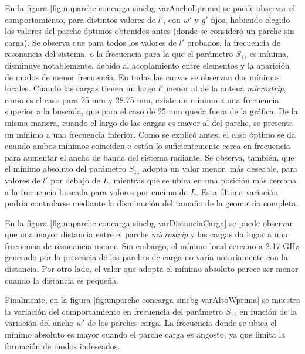 En la figura \ref{fig:unparche-concarga-sinebg-varAnchoLprima} se puede observar el comportamiento, para distintos valores de $l'$, con $w'$ y $g'$ fijos, habiendo elegido los valores del parche óptimos obtenidos antes (donde se consideró un parche sin carga). Se observa que para todos los valores de $l'$ probados, la frecuencia de resonancia del sistema, o la frecuencia para la que el parámetro $S_{11}$ es mínima, disminuye notablemente, debido al acoplamiento entre elementos y la aparición de modos de menor frecuencia. En todas las curvas se observan dos mínimos locales. Cuando las cargas tienen un largo $l'$ menor al de la antena \textit{microstrip}, como es el caso para 25 mm y 28.75 mm, existe un mínimo a una frecuencia superior a la buscada, que para el caso de 25 mm queda fuera de la gráfica. De la misma manera, cuando el largo de las cargas es mayor al del parche, se presenta un mínimo a una frecuencia inferior. Como se explicó antes, el caso óptimo se da cuando ambos mínimos coinciden o están lo suficientemente cerca en frecuencia para aumentar el ancho de banda del sistema radiante. Se observa, también, que el mínimo absoluto del parámetro $S_{11}$ adopta un valor menor, más deseable, para valores de $l'$ por debajo de $L$, mientras que se ubica en una posición más cercana a la frecuencia buscada para valores por encima de $L$. Esta última variación podría controlarse mediante la disminución del tamaño de la geometría completa.

En la figura \ref{fig:unparche-concarga-sinebg-varDistanciaCarga} se puede observar que una mayor distancia entre el parche \textit{microstrip} y las cargas da lugar a una frecuencia de resonancia menor. Sin embargo, el mínimo local cercano a 2.17 GHz generado por la presencia de los parches de carga no varía notoriamente con la distancia. Por otro lado, el valor que adopta el mínimo absoluto parece ser menor cuando la distancia es pequeña.

Finalmente, en la figura \ref{fig:unparche-concarga-sinebg-varAltoWprima} se muestra la variación del comportamiento en frecuencia del parámetro $S_{11}$ en función de la variación del ancho $w'$ de los parches carga. La frecuencia donde se ubica el mínimo absoluto es mayor cuando el parche carga es angosto, ya que limita la formación de modos indeseados.

